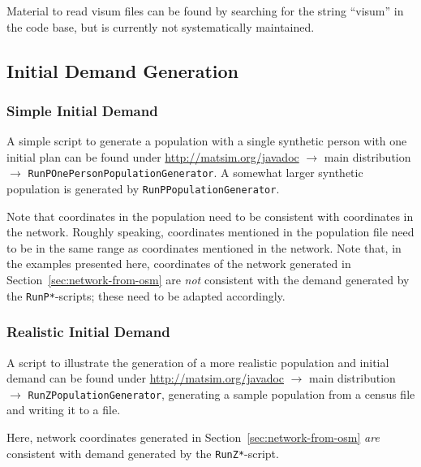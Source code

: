 Material to read \gls{visum} files can be found by searching for the string ``visum'' in the code base, but is currently not systematically maintained.



\subsection{Initial Demand Generation}
\label{sec:extending-initial-demand}

\subsubsection{Simple Initial Demand}

A simple script to generate a population with a single synthetic person with one initial plan can be found under \url{http://matsim.org/javadoc} $\to$ main distribution $\to$ \lstinline{RunPOnePersonPopulationGenerator}.  A somewhat larger synthetic population is generated by \lstinline{RunPPopulationGenerator}.

Note that coordinates in the population need to be consistent with coordinates in the network.  Roughly speaking, coordinates mentioned in the population file need to be in the same range as coordinates mentioned in the network.  Note that, in the examples presented here, coordinates of the network generated in Section~\ref{sec:network-from-osm} are \emph{not} consistent with the demand generated by the \lstinline{RunP*}-scripts; these need to be adapted accordingly.

\subsubsection{Realistic Initial Demand}

A script to illustrate the generation of a more realistic population and initial demand can be found under \url{http://matsim.org/javadoc} $\to$ main distribution $\to$ \lstinline{RunZPopulationGenerator}, generating a sample population from a census file and writing it to a file.

Here, network coordinates generated in Section~\ref{sec:network-from-osm} \emph{are} consistent with demand generated by the \lstinline{RunZ*}-script.



